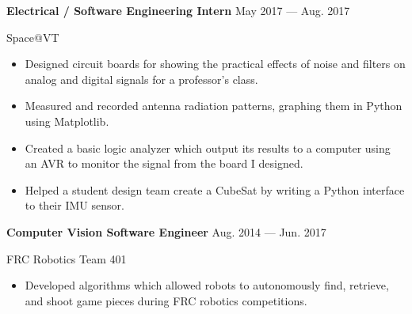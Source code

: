 \parbox[t][][t]{\linewidth}{
	\parbox{\linewidth}{\textbf{Electrical / Software Engineering Intern}
		\hfill {{May 2017 --- Aug. 2017}}}
	\smallbreak
	\parbox{\linewidth}{Space@VT}
	
	\bigskip
	\begin{itemize}
		\item{Designed circuit boards for showing the practical effects of noise and filters on analog and digital signals for a professor's class.}\\[-.6em]
		
		\item{Measured and recorded antenna radiation patterns, graphing them in Python using Matplotlib.}\\[-.6em]
		
		\item{Created a basic logic analyzer which output its results to a computer using an AVR to monitor the signal from the board I designed.}\\[-.6em]
		
		\item{Helped a student design team create a CubeSat by writing a Python interface to their IMU sensor.}
		
	\end{itemize}
	\bigskip
	\bigskip
}

\parbox[t][][t]{\linewidth}{
	\parbox{\linewidth}{\textbf{Computer Vision Software Engineer}
		\hfill {{Aug. 2014 --- Jun. 2017}}}
	\smallbreak
	\parbox{\linewidth}{FRC Robotics Team 401}
	
	\bigskip
		\begin{itemize}
	\item{Developed algorithms which allowed robots to autonomously find, retrieve, and shoot game pieces during FRC robotics competitions.}
		\end{itemize}
}
